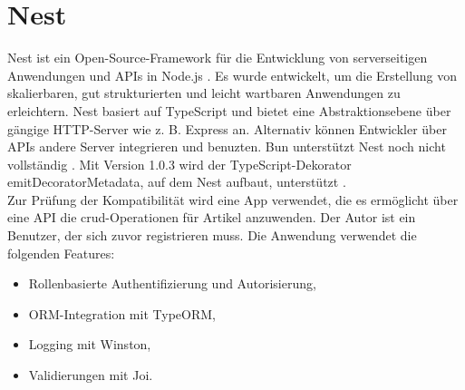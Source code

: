 \section{Nest} \label{sec:compabitility-nest}
Nest ist ein Open-Source-Framework für die Entwicklung von serverseitigen Anwendungen und APIs in Node.js \cite{Mysliwiec.2023}. Es wurde entwickelt, um die Erstellung von skalierbaren, gut strukturierten und leicht wartbaren Anwendungen zu erleichtern. Nest basiert auf TypeScript und bietet eine Abstraktionsebene über gängige HTTP-Server wie z. B. Express an. Alternativ können Entwickler über APIs andere Server integrieren und benuzten. Bun unterstützt Nest noch nicht vollständig \cite{Sumner.2022b}. Mit Version 1.0.3 wird der TypeScript-Dekorator \glq emitDecoratorMetadata\grq{}, auf dem Nest aufbaut, unterstützt \cite{McDonnel.2023}.\\

\noindent
Zur Prüfung der Kompatibilität wird eine App verwendet, die es ermöglicht über eine API die \ac{crud}-Operationen für Artikel anzuwenden. Der Autor ist ein Benutzer, der sich zuvor registrieren muss. Die Anwendung verwendet die folgenden Features:

\begin{itemize}
	\item Rollenbasierte Authentifizierung und Autorisierung,
	\item ORM-Integration mit TypeORM,
	\item Logging mit Winston,
	\item Validierungen mit Joi.
\end{itemize}

